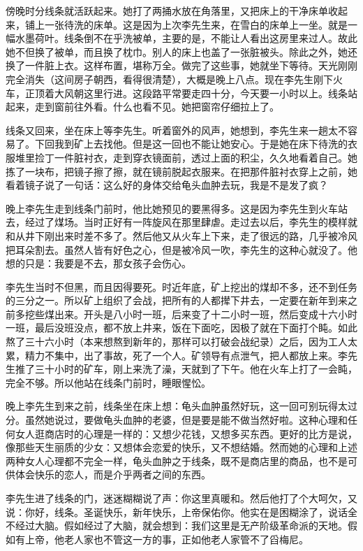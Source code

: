 傍晚时分线条就活跃起来。她打了两捅水放在角落里，又把床上的干净床单收起来，铺上一张待洗的床单。这是因为上次李先生来，在雪白的床单上一坐。就是一幅水墨荷叶。线条倒不在乎洗被单，主要的是，不能让人看出这房里来过人。故此她不但换了被单，而且换了枕巾。别人的床上也盖了一张脏被头。除此之外，她还换了一件脏上衣。这样布置，堪称万全。做完了这些事，她就坐下等待。天光刚刚完全消失（这间房子朝西，看得很清楚），大概是晚上八点。现在李先生刚下火车，正顶着大风朝这里行进。这段路平常要走四十分，今天要一小时以上。线条站起来，走到窗前往外看。什么也看不见。她把窗帘仔细拉上了。 

线条又回来，坐在床上等李先生。听着窗外的风声，她想到，李先生来一趟太不容易了。下回我到矿上去找他。但是这一回也不能让她安心。于是她在床下待洗的衣服堆里捡丁一件脏衬衣，走到穿衣镜面前，透过上面的积尘，久久地看着自己。她拣了一块布，把镜子擦了擦，就在镜前脱起衣服来。在把那件脏衬衣穿上之前，她看着镜子说了一句话：这么好的身体交给龟头血肿去玩，我是不是发了疯？ 

晚上李先生走到线条门前时，他比她预见的要黑得多。这是因为李先生到火车站去，经过了煤场。当时正好有一阵旋风在那里肆虐。走过去以后，李先生的模样就和从井下刚出来时差不多了。然后他又从火车上下来，走了很远的路，几乎被冷风把耳朵割去。虽然人皆有好色之心，但是被冷风一吹，李先生的这种心就没了。他想的只是：我要是不去，那女孩子会伤心。 

李先生当时不但黑，而且因得要死。时近年底，矿上挖出的煤却不多，还不到任务的三分之一。所以矿上组织了会战，把所有的人都撵下井去，一定要在新年到来之前多挖些煤出来。开头是八小时一班，后来变了十二小时一班，然后变成十六小时一班，最后没班没点，都不放上井来，饭在下面吃，因极了就在下面打个盹。如此熬了三十六小时（本来想熬到新年的，那样可以打破会战纪录）之后，因为工人太累，精力不集中，出了事故，死了一个人。矿领导有点泄气，把人都放上来。李先生推了三十小时的矿车，刚上来洗了澡，天就到了下午。他在火车上打了一会盹，完全不够。所以他站在线条门前时，睡眼惺忪。 

晚上李先生到来之前，线条坐在床上想：龟头血肿虽然好玩，这一回可别玩得太过分。虽然她说过，要做龟头血肿的老婆，但是要是能不做当然好啦。这种心理和任何女人逛商店时的心理是一样的：又想少花钱，又想多买东西。更好的比方是说，像那些天生丽质的少女：又想体会恋爱的快乐，又不想结婚。然而她的心理和上述两种女人心理都不完全一样，龟头血肿之于线条，既不是商店里的商品，也不是可供体会快乐的恋人，而是介乎两者之间的东西。 

李先生进了线条的门，迷迷糊糊说了声：你这里真暖和。然后他打了个大呵欠，又说：你好，线条。圣诞快乐，新年快乐，上帝保佑你。他实在是困糊涂了，说话全不经过大脑。假如经过了大脑，就会想到：我们这里是无产阶级革命派的天地。假如有上帝，他老人家也不管这一方的事，正如他老人家管不了舀梅尼。

